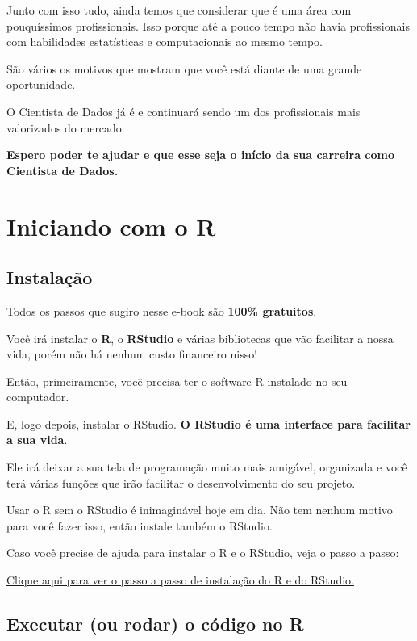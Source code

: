 \documentclass[
]{book}
\begin{document}
Junto com isso tudo, ainda temos que considerar que é uma área com
pouquíssimos profissionais. Isso porque até a pouco tempo não havia
profissionais com habilidades estatísticas e computacionais ao mesmo
tempo.

São vários os motivos que mostram que você está diante de uma grande
oportunidade.

O Cientista de Dados já é e continuará sendo um dos profissionais mais
valorizados do mercado.

\textbf{Espero poder te ajudar e que esse seja o início da sua carreira
como Cientista de Dados.}

\hypertarget{iniciando-com-o-r}{%
\chapter{Iniciando com o R}\label{iniciando-com-o-r}}

\hypertarget{instalauxe7uxe3o}{%
\section{Instalação}\label{instalauxe7uxe3o}}

Todos os passos que sugiro nesse e-book são \textbf{100\% gratuitos}.

Você irá instalar o \textbf{R}, o \textbf{RStudio} e várias bibliotecas
que vão facilitar a nossa vida, porém não há nenhum custo financeiro
nisso!

Então, primeiramente, você precisa ter o software R instalado no seu
computador.

E, logo depois, instalar o RStudio. \textbf{O RStudio é uma interface
para facilitar a sua vida}.

Ele irá deixar a sua tela de programação muito mais amigável, organizada
e você terá várias funções que irão facilitar o desenvolvimento do seu
projeto.

Usar o R sem o RStudio é inimaginável hoje em dia. Não tem nenhum motivo
para você fazer isso, então instale também o RStudio.

Caso você precise de ajuda para instalar o R e o RStudio, veja o passo a
passo:

\href{https://www.luisotavio.pro/blog/como-instalar-o-r-e-o-rstudio/}{Clique
aqui para ver o passo a passo de instalação do R e do RStudio.}

\hypertarget{executar-ou-rodar-o-cuxf3digo-no-r}{%
\section{Executar (ou rodar) o código no
R}\label{executar-ou-rodar-o-cuxf3digo-no-r}}
\end{document}
